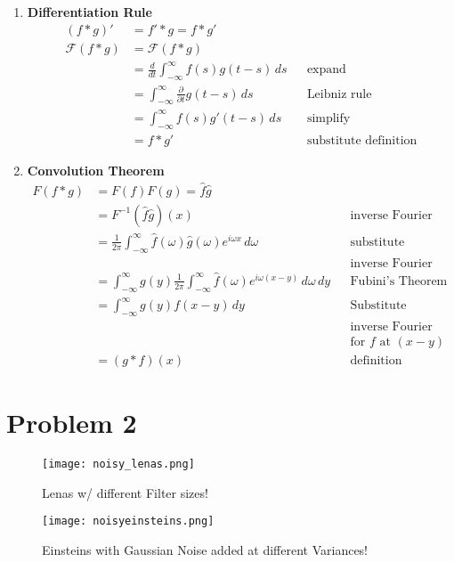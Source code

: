\documentclass[11pt]{article}
\begin{document}
\begin{enumerate}
\item {\bf Differentiation Rule}
\begin{align*}
    (f*g)' &= f' *g = f* g' \\
    \mathscr{F}(f * g) &= \mathscr{F}(f * g) && \text{} \\
    &= \frac{d}{dt} \int_{-\infty}^{\infty} f(s)g(t-s) \, ds && \text{expand} \\
    &= \int_{-\infty}^{\infty}\frac{\partial}{\partial t}g(t-s) \, ds && \text{Leibniz rule} \\
    &= \int_{-\infty}^{\infty} f(s)g'(t-s) \, ds && \text{simplify} \\
    &= f*g' && \text{substitute definition}
\end{align*}
\item {\bf Convolution Theorem}
\begin{align*}
    F(f*g) &= F(f)F(g) = \hat{f}\hat{g} \\
    &= F^{-1}(\hat{f}\hat{g})(x) && \text{inverse Fourier transform} \\
    &= \frac{1}{2\pi} \int_{-\infty}^{\infty} \hat{f}(\omega)\hat{g}(\omega)e^{i\omega x} \, d\omega && \text{substitute definition of} \\
    &&& \text{inverse Fourier Transform} \\
    &= \int_{-\infty}^{\infty} g(y)\frac{1}{2\pi}\int_{-\infty}^{\infty} \hat{f}(\omega)e^{i\omega(x-y)}\, d\omega \, dy && \text{Fubini's Theorem} \\
    &= \int_{-\infty}^{\infty} g(y)f(x-y) \, dy && \text{Substitute definition of} \\
    &&& \text{inverse Fourier Transform} \\
    &&& \text{for $f$ at $(x-y)$} \\
    &= (g*f)(x) && \text{definition}
\end{align*}
\end{enumerate}

\section*{Problem 2}
\begin{figure}[h!]
\begin{center}
\texttt{[image: noisy\_lenas.png]}
\caption{Lenas w/ different Filter sizes!}
\label{fig:lena}
\end{center}
\end{figure}

\begin{figure}[h!]
\begin{center}
\texttt{[image: noisyeinsteins.png]}
\caption{Einsteins with Gaussian Noise added at different Variances!}
\label{fig:einstein}
\end{center}
\end{figure}
\end{document}
